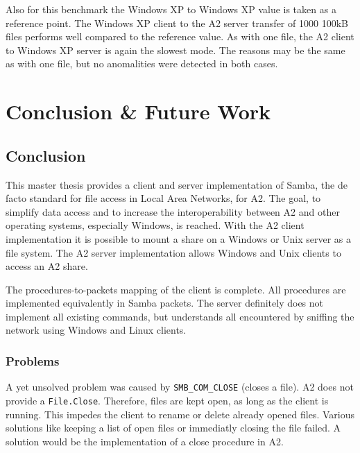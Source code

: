 \documentclass[11pt,a4paper]{book}
\begin{document}
Also for this benchmark the Windows XP to Windows XP value is taken as a reference point. The Windows XP client to the A2 server transfer of 1000 100kB files performs well compared to the reference value. As with one file, the A2 client to Windows XP server is again the slowest mode. The reasons may be the same as with one file, but no anomalities were detected in both cases.

\chapter{Conclusion \& Future Work}

\section{Conclusion}
This master thesis provides a client and server implementation of Samba, the de facto standard for file access in Local Area Networks, for A2. The goal, to simplify data access and to increase the interoperability between A2 and other operating systems, especially Windows, is reached. With the A2 client implementation it is possible to mount a share on a Windows or Unix server as a file system. The A2 server implementation allows Windows and Unix clients to access an A2 share.

The procedures-to-packets mapping of the client is complete. All procedures are implemented equivalently in Samba packets. The server definitely does not implement all existing commands, but understands all encountered by sniffing the network using Windows and Linux clients.

\subsection{Problems}
A yet unsolved problem was caused by \texttt{SMB\_COM\_CLOSE} (closes a file). A2 does not provide a \texttt{File.Close}. Therefore, files are kept open, as long as the client is running. This impedes the client to rename or delete already opened files. Various solutions like keeping a list of open files or immediatly closing the file failed. A solution would be the implementation of a close procedure in A2.
\end{document}
